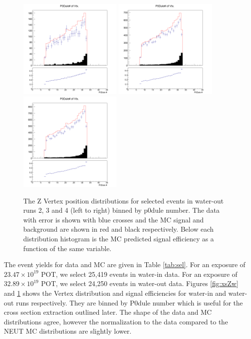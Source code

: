 \begin{figure}[h]
\centering
\includegraphics[width=2in]{Figures/TN100Plots/c_Layerair_2.png}
\includegraphics[width=2in]{Figures/TN100Plots/c_Layerair_3.png}
\includegraphics[width=2in]{Figures/TN100Plots/c_Layerair_4.png}
\caption{The Z Vertex position distributions for selected events in water-out runs 2, 3 and 4 (left to right) binned by p0dule number. The data with error is shown with blue crosses and the MC signal and background are shown in red and black respectively. Below each distribution histogram is the MC predicted signal efficiency as a function of the same variable.}
\label{fig:xsZa}
\end{figure}

The event yields for data and MC are given in Table \ref{tab:sel}. For an exposure of $23.47\times 10^{19}$ POT, we select 25,419 events in water-in data. For an exposure of $32.89\times 10^{19}$ POT, we select 24,250 events in water-out data. Figures \ref{fig:xsZw} and \ref{fig:xsZa} shows the Vertex distribution and signal efficiencies for water-in and water-out runs respectively. They are binned by P0dule number which is useful for the cross section extraction outlined later. The shape of the data and MC distributions agree, however the normalization to the data compared to the NEUT MC distributions are slightly lower.

